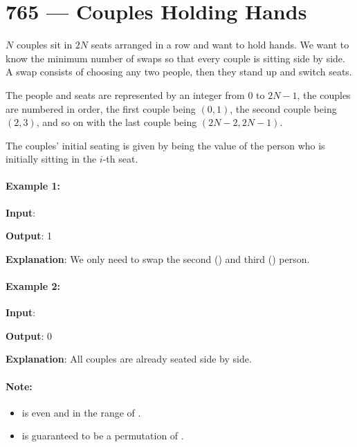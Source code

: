 \section{765 --- Couples Holding Hands}
$N$ couples sit in $2N$ seats arranged in a row and want to hold hands. We want to know the minimum number of swaps so that every couple is sitting side by side. A swap consists of choosing any two people, then they stand up and switch seats.

The people and seats are represented by an integer from 0 to $ 2N-1 $, the couples are numbered in order, the first couple being $ (0, 1) $, the second couple being $ (2, 3) $, and so on with the last couple being $ (2N-2, 2N-1) $.

The couples' initial seating is given by  being the value of the person who is initially sitting in the $i$-th seat.

\paragraph{Example 1:}

\begin{flushleft}
\textbf{Input}: 

\textbf{Output}: 1

\textbf{Explanation}: We only need to swap the second () and third () person.
\end{flushleft}

\paragraph{Example 2:}

\begin{flushleft}
\textbf{Input}: 

\textbf{Output}: 0

\textbf{Explanation}: All couples are already seated side by side.
\end{flushleft}

\paragraph{Note:}

\begin{itemize}
\item {} is even and in the range of \fcj{[4, 60]}.
\item {} is guaranteed to be a permutation of .
\end{itemize}
